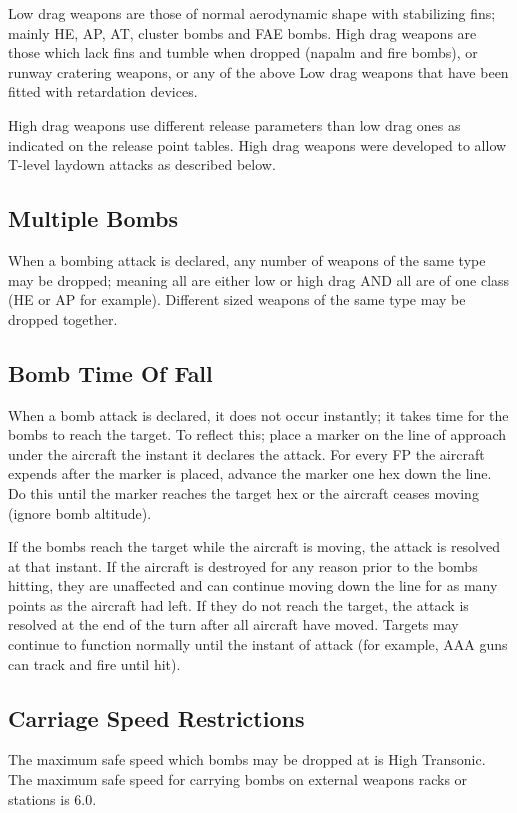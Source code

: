 Low drag weapons are those of normal aerodynamic shape with stabilizing fins; mainly HE, AP, AT, cluster bombs and FAE bombs. High drag weapons are those which lack fins and tumble when dropped (napalm and fire bombs), or runway cratering weapons, or any of the above Low drag weapons that have been fitted with retardation devices.

High drag weapons use different release parameters than low drag ones as indicated on the release point tables. High drag weapons were developed to allow T-level laydown attacks as described below.

\subsection{Multiple Bombs} When a bombing attack is declared, any number of weapons of the same type may be dropped; meaning all are either low or high drag AND all are of one class (HE or AP for example). Different sized weapons of the same type may be dropped together.

\subsection{Bomb Time Of Fall} When a bomb attack is declared, it does not occur instantly; it takes time for the bombs to reach the target. To reflect this; place a marker on the line of approach under the aircraft the instant it declares the attack. For every FP the aircraft expends after the marker is placed, advance the marker one hex down the line. Do this until the marker reaches the target hex or the aircraft ceases moving (ignore bomb altitude).

If the bombs reach the target while the aircraft is moving, the attack is resolved at that instant. If the aircraft is destroyed for any reason prior to the bombs hitting, they are unaffected and can continue moving down the line for as many points as the aircraft had left. If they do not reach the target, the attack is resolved at the end of the turn after all aircraft have moved.  Targets may continue to function normally until the instant of attack (for example, AAA guns can track and fire until hit).

\subsection{Carriage Speed Restrictions} The maximum safe speed which bombs may be dropped at is High Transonic. The maximum safe speed for carrying bombs on external weapons racks or stations is 6.0.


